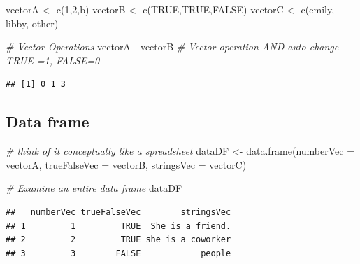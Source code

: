 \documentclass[
]{book}
\newenvironment{Shaded}{\begin{snugshade}}{\end{snugshade}}
\newcommand{\AttributeTok}[1]{\textcolor[rgb]{0.77,0.63,0.00}{#1}}
\newcommand{\CommentTok}[1]{\textcolor[rgb]{0.56,0.35,0.01}{\textit{#1}}}
\newcommand{\ConstantTok}[1]{\textcolor[rgb]{0.00,0.00,0.00}{#1}}
\newcommand{\DecValTok}[1]{\textcolor[rgb]{0.00,0.00,0.81}{#1}}
\newcommand{\FunctionTok}[1]{\textcolor[rgb]{0.00,0.00,0.00}{#1}}
\newcommand{\NormalTok}[1]{#1}
\newcommand{\OtherTok}[1]{\textcolor[rgb]{0.56,0.35,0.01}{#1}}
\newcommand{\SpecialCharTok}[1]{\textcolor[rgb]{0.00,0.00,0.00}{#1}}
\begin{document}
\begin{Shaded}
\begin{Highlighting}[]
\NormalTok{vectorA }\OtherTok{\textless{}{-}} \FunctionTok{c}\NormalTok{(}\DecValTok{1}\NormalTok{,}\DecValTok{2}\NormalTok{,b)}
\NormalTok{vectorB }\OtherTok{\textless{}{-}} \FunctionTok{c}\NormalTok{(}\ConstantTok{TRUE}\NormalTok{,}\ConstantTok{TRUE}\NormalTok{,}\ConstantTok{FALSE}\NormalTok{)}
\NormalTok{vectorC }\OtherTok{\textless{}{-}} \FunctionTok{c}\NormalTok{(emily, libby, other) }

\CommentTok{\# Vector Operations}
\NormalTok{vectorA }\SpecialCharTok{{-}}\NormalTok{ vectorB }\CommentTok{\# Vector operation AND auto{-}change TRUE =1, FALSE=0}
\end{Highlighting}
\end{Shaded}

\begin{verbatim}
## [1] 0 1 3
\end{verbatim}

\hypertarget{data-frame}{%
\subsection*{Data frame}\label{data-frame}}

\begin{Shaded}
\begin{Highlighting}[]
\CommentTok{\# think of it conceptually like a spreadsheet}
\NormalTok{dataDF }\OtherTok{\textless{}{-}} \FunctionTok{data.frame}\NormalTok{(}\AttributeTok{numberVec    =}\NormalTok{ vectorA,}
                     \AttributeTok{trueFalseVec =}\NormalTok{ vectorB,}
                     \AttributeTok{stringsVec   =}\NormalTok{ vectorC)}

\CommentTok{\# Examine an entire data frame  }
\NormalTok{dataDF}
\end{Highlighting}
\end{Shaded}

\begin{verbatim}
##   numberVec trueFalseVec        stringsVec
## 1         1         TRUE  She is a friend.
## 2         2         TRUE she is a coworker
## 3         3        FALSE            people
\end{verbatim}

\begin{Shaded}
\end{Shaded}
\end{document}
